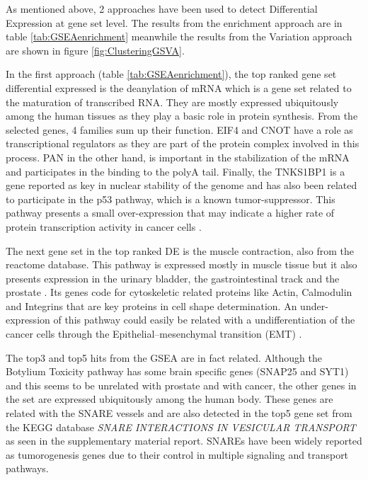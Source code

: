 \documentclass[9pt,twocolumn,twoside]{gsajnl}
\begin{document}
As mentioned above, 2 approaches have been used to detect Differential Expression at gene set level. The results from the enrichment approach are in table \ref{tab:GSEAenrichment} meanwhile the results from the Variation approach are shown in figure \ref{fig:ClusteringGSVA}.

In the first approach (table \ref{tab:GSEAenrichment}), the top ranked gene set differential expressed is the deanylation of mRNA which is a gene set related to the maturation of transcribed RNA. They are mostly expressed ubiquitously among the human tissues as they play a basic role in protein synthesis. From the selected genes, 4 families sum up their function. EIF4 and CNOT have a role as transcriptional regulators as they are part of the protein complex involved in this process. PAN in the other hand, is important in the stabilization of the mRNA and participates in the binding to the polyA tail. Finally, the TNKS1BP1 is a gene reported as key in nuclear stability of the genome and has also been related to participate in the p53 pathway, which is a known tumor-suppressor. This pathway presents a small over-expression that may indicate a higher rate of protein transcription activity in cancer cells \cite{proteinatlas,uhlen2015tissue}.

The next gene set in the top ranked DE is the muscle contraction, also from the reactome database. This pathway is expressed mostly in muscle tissue but it also presents expression in the urinary bladder, the gastrointestinal track and the prostate \cite{proteinatlas,uhlen2015tissue}. Its genes code for cytoskeletic related proteins like Actin, Calmodulin and Integrins that are key proteins in cell shape determination. An under-expression of this pathway could easily be related with a undifferentiation of the cancer cells through the Epithelial–mesenchymal transition (EMT) \citep{yilmaz2009emt}.

The top3 and top5 hits from the GSEA are in fact related. Although the Botylium Toxicity pathway has some brain specific genes (SNAP25 and SYT1) and this seems to be unrelated with prostate and with cancer, the other genes in the set are expressed ubiquitously among the human body. These genes are related with the SNARE vessels and are also detected in the top5 gene set from the KEGG database \textit{SNARE INTERACTIONS IN VESICULAR TRANSPORT} as seen in the supplementary material report. SNAREs have been widely reported as tumorogenesis genes due to their control in multiple signaling and transport pathways.
\end{document}
